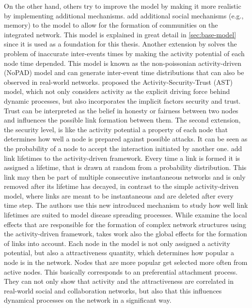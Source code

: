 On the other hand, others try to improve the model by making it more realistic by implementing additional mechanisms.
\citet{Laurent2015} add additional social mechanisms (e.g., memory) to the model to allow for the formation of communities on the integrated network.
This model is explained in great detail in \cref{sec:base-model} since it is used as a foundation for this thesis.
Another extension by \citet{Moinet2015, Moinet2016} solves the problem of inaccurate inter-events times by making the activity potential of each node time depended.
This model is known as the non-poissonian activity-driven (NoPAD) model and can generate inter-event time distributions that can also be observed in real-world networks.
\citet{Wang2016} proposed the Activity-Security-Trust (AST) model, which not only considers activity as the explicit driving force behind dynamic processes, but also incorporates the implicit factors security and trust.
Trust can be interpreted as the belief in honesty or fairness between two nodes and influences the possible link formation between them.
The second extension, the security level, is like the activity potential a property of each node that determines how well a node is prepared against possible attacks.
It can be seen as the probability of a node to accept the interaction initiated by another one.
\citet{Sunny2015} add link lifetimes to the activity-driven framework.
Every time a link is formed it is assigned a lifetime, that is drawn at random from a probability distribution.
This link may then be part of multiple consecutive instantaneous networks
and is only removed after its lifetime has decayed, in contrast to the simple activity-driven model, where links are meant to be instantaneous and are deleted after every time step.
The authors use this new introduced mechanism to study how well link lifetimes are suited to model disease spreading processes.
While \citet{Laurent2015} examine the local effects that are responsible for the formation of complex network structures using the activity-driven framework, takes \citet{Alessandretti2017} work also the global effects for the formation of links into account.
Each node in the model is not only assigned a activity potential, but also a attractiveness quantity, which determines how popular a node is in the network.
Nodes that are more popular get selected more often from active nodes.
This basically corresponds to an preferential attachment process.
They can not only show that activity and the attractiveness are correlated in real-world social and collaboration networks, but also that this influences dynamical processes on the network in a significant way.


